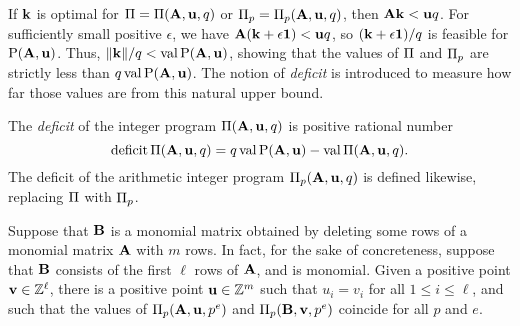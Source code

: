 \documentclass{article}
\begin{document}
If $\mathbf{k}$ is optimal for $\Pi = \Pi(\mathbf{A},\mathbf{u},q)$ or $\Pi_p = \Pi_p(\mathbf{A},\mathbf{u},q)$, then $\mathbf{A}\mathbf{k} < \mathbf{u}q$.
For sufficiently small positive $\epsilon$, we have $\mathbf{A}(\mathbf{k}+\epsilon\mathbf{1}) < \mathbf{u}q$, so $(\mathbf{k}+\epsilon \mathbf{1})/q$ is feasible for $\mathrm{P}(\mathbf{A},\mathbf{u})$.
Thus, $\| \mathbf{k} \|/q < \operatorname{val} \mathrm{P}(\mathbf{A},\mathbf{u})$,
showing that the values of $\Pi$ and $\Pi_p$ are strictly less than $q\operatorname{val} \mathrm{P}(\mathbf{A},\mathbf{u})$.
The notion of \emph{deficit} is introduced to measure how far those values are from this natural upper bound.

\begin{definition}
   The \emph{deficit} of the integer program $\Pi(\mathbf{A}, \mathbf{u}, q)$ is positive rational number
   \[ \operatorname{deficit} \Pi(\mathbf{A}, \mathbf{u}, q) = q\operatorname{val} \mathrm{P}(\mathbf{A},\mathbf{u}) - \operatorname{val} \Pi(\mathbf{A}, \mathbf{u}, q).\]
   The deficit of the arithmetic integer program $\Pi_p(\mathbf{A}, \mathbf{u}, q)$ is defined likewise, replacing $\Pi$ with $\Pi_p$.
\end{definition}

\begin{lemma} 
   \label{lifted-programs: L}
   Suppose that $\mathbf{B}$ is a monomial matrix obtained by deleting some rows of a monomial matrix $\mathbf{A}$ with $m$ rows.
   In fact, for the sake of concreteness, suppose that $\mathbf{B}$ consists of the first $\ell$ rows of $\mathbf{A}$, and is monomial.
   Given a positive point $\mathbf{v} \in \mathbb{Z}^{\ell}$, there is a positive point $\mathbf{u} \in \mathbb{Z}^{m}$ such that $u_i = v_i$ for all $1 \leq i \leq \ell$, and such that the values of $\Pi_p(\mathbf{A}, \mathbf{u}, p^e)$ and $\Pi_p(\mathbf{B}, \mathbf{v}, p^e)$ coincide for all $p$ and $e$.
\end{lemma}
\end{document}
